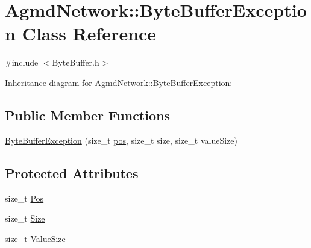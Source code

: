 \hypertarget{class_agmd_network_1_1_byte_buffer_exception}{\section{Agmd\+Network\+:\+:Byte\+Buffer\+Exception Class Reference}
\label{class_agmd_network_1_1_byte_buffer_exception}
}


{\ttfamily \#include $<$Byte\+Buffer.\+h$>$}



Inheritance diagram for Agmd\+Network\+:\+:Byte\+Buffer\+Exception\+:
\subsection*{Public Member Functions}
\begin{DoxyCompactItemize}
\item 
\hyperlink{class_agmd_network_1_1_byte_buffer_exception_ad72ebc137d83204bebcbb95dbeba21dd}{Byte\+Buffer\+Exception} (size\+\_\+t \hyperlink{_examples_2_planet_2_app_8cpp_aa8a1c0491559faca4ebd0881575ae7f0}{pos}, size\+\_\+t size, size\+\_\+t value\+Size)
\end{DoxyCompactItemize}
\subsection*{Protected Attributes}
\begin{DoxyCompactItemize}
\item 
size\+\_\+t \hyperlink{class_agmd_network_1_1_byte_buffer_exception_a6b4c1bdfe4ed95435e94af7766303125}{Pos}
\item 
size\+\_\+t \hyperlink{class_agmd_network_1_1_byte_buffer_exception_a4040428cb697f99cb4dbab00c1fe6fd3}{Size}
\item 
size\+\_\+t \hyperlink{class_agmd_network_1_1_byte_buffer_exception_ae28dfd2f4d2c0c8a4180f14d9d5b7d0b}{Value\+Size}
\end{DoxyCompactItemize}


